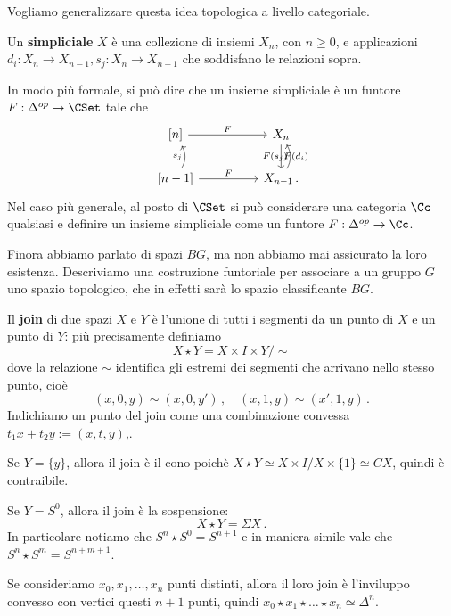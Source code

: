 Vogliamo generalizzare questa idea topologica a livello categoriale.
\begin{df}
	Un \textbf{simpliciale} $X$ è una collezione di insiemi $X_{n}$, con $n \ge 0$,
	e applicazioni $d_{i}:X_{n} \to X_{n-1}, s_{j}:X_{n} \to X_{n-1}$ che soddisfano
	le relazioni sopra. 
\end{df}

In modo più formale, si può dire che un insieme simpliciale è un funtore
$F : \Delta^{op} \to \CSet$ tale che
\begin{equation*}
	\begin{tikzcd}
		{[n]} \ar[rr, "F"] & & X_{n} \ar[d, "F(d_{i})"] \\
		{[n-1]} \ar[rr, "F"] \ar[u, bend right, "s_{j}"] & & X_{n-1} \ar[u, bend right, "F(s_{j})"]\,.
	\end{tikzcd}
\end{equation*}
Nel caso più generale, al posto di $\CSet$ si può considerare una categoria $\Cc$ qualsiasi
e definire un insieme simpliciale come un funtore $F:\Delta^{op} \to \Cc$.


Finora abbiamo parlato di spazi $BG$, ma non abbiamo mai assicurato la loro esistenza.
Descriviamo una costruzione funtoriale per associare
a un gruppo $G$ uno spazio topologico,
che in effetti sarà lo spazio classificante $BG$.

Il \textbf{join} di due spazi $X$ e $Y$
è l'unione di tutti i segmenti da un punto di $X$ e un punto di $Y$:
più precisamente definiamo
\begin{equation*}
	X \star Y = X \times I \times Y/ \sim
\end{equation*}
dove la relazione $\sim$ identifica gli estremi dei segmenti che arrivano
nello stesso punto, cioè
\begin{equation*}
	(x,0,y) \sim (x,0,y')\,, \quad (x,1,y) \sim (x',1,y)\,.
\end{equation*}
Indichiamo un punto del join come una combinazione convessa
$t_{1}x + t_{2}y := (x,t,y)$,.

\begin{ex}
	\begin{rmnumerate}
		\item Se $Y = \{y\}$, allora il join è il cono poichè
		$X \star Y \simeq X \times I/ X \times \{1\} \simeq CX$,
		quindi è contraibile.
		
		\item Se $Y = S^{0}$, allora il join è la sospensione:
		\begin{equation*}
			X \star Y = \Sigma X\,.
		\end{equation*}
		In particolare notiamo che $S^{n} \star S^{0} = S^{n+1}$
		e in maniera simile vale che $S^{n} \star S^{m} = S^{n+m+1}$.
		
		\item Se consideriamo $x_{0}, x_{1}, \dots, x_{n}$ punti distinti,
		allora il loro join è l'inviluppo convesso con vertici questi $n+1$ punti,
		quindi $x_{0} \star x_{1} \star \dots \star x_{n} \simeq \Delta^{n}$.
	\end{rmnumerate}
\end{ex}

